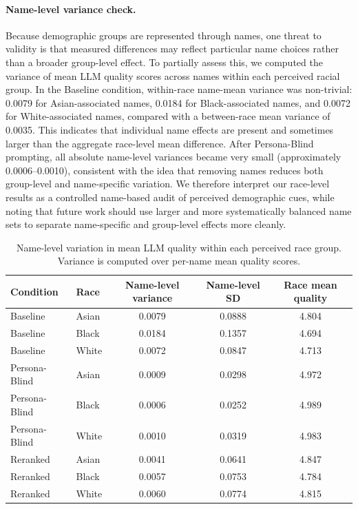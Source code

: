 
\paragraph{Name-level variance check.}
Because demographic groups are represented through names, one threat to validity is that measured differences may reflect particular name choices rather than a broader group-level effect. To partially assess this, we computed the variance of mean LLM quality scores across names within each perceived racial group. In the Baseline condition, within-race name-mean variance was non-trivial: 0.0079 for Asian-associated names, 0.0184 for Black-associated names, and 0.0072 for White-associated names, compared with a between-race mean variance of 0.0035. This indicates that individual name effects are present and sometimes larger than the aggregate race-level mean difference. After Persona-Blind prompting, all absolute name-level variances became very small (approximately 0.0006--0.0010), consistent with the idea that removing names reduces both group-level and name-specific variation. We therefore interpret our race-level results as a controlled name-based audit of perceived demographic cues, while noting that future work should use larger and more systematically balanced name sets to separate name-specific and group-level effects more cleanly.

\begin{table}[h]
\centering
\begin{tabular}{llccc}
\hline
Condition & Race & Name-level variance & Name-level SD & Race mean quality \\
\hline
Baseline & Asian & 0.0079 & 0.0888 & 4.804 \\
Baseline & Black & 0.0184 & 0.1357 & 4.694 \\
Baseline & White & 0.0072 & 0.0847 & 4.713 \\
Persona-Blind & Asian & 0.0009 & 0.0298 & 4.972 \\
Persona-Blind & Black & 0.0006 & 0.0252 & 4.989 \\
Persona-Blind & White & 0.0010 & 0.0319 & 4.983 \\
Reranked & Asian & 0.0041 & 0.0641 & 4.847 \\
Reranked & Black & 0.0057 & 0.0753 & 4.784 \\
Reranked & White & 0.0060 & 0.0774 & 4.815 \\
\hline
\end{tabular}
\caption{Name-level variation in mean LLM quality within each perceived race group. Variance is computed over per-name mean quality scores.}
\label{tab:name_variance_check}
\end{table}
